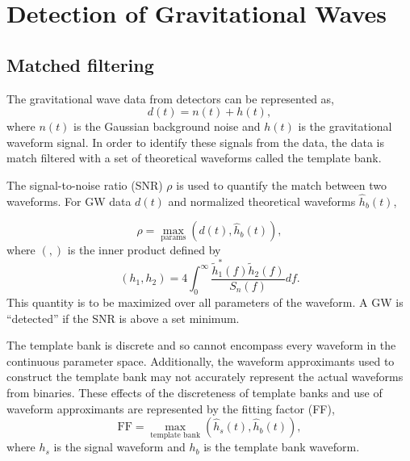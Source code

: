 \documentclass{article}
\newcommand{\red}[1]{{\color{red}{#1}\xspace}}
\begin{document}
\section{Detection of Gravitational Waves}
\subsection{Matched filtering}
The gravitational wave data from detectors can be represented as,
\begin{equation}
    d(t) = n(t) + h(t) ,\label{GWData}
\end{equation}
where $n(t)$ is the Gaussian \red{The noise is not generally Gaussian,
although over short periods in time it is often approximated as
Gaussian. Much of the analysis goes through without this assumption. Can
you make it clear where you really need the Gaussian assumption?}
background noise and $h(t)$ is the gravitational waveform signal. In order to identify these signals from the data, the data is match filtered with a set of theoretical waveforms called the template bank.

The signal-to-noise ratio (SNR) $\rho$ is used to quantify the match between two waveforms. For GW data $d(t)$ and normalized theoretical waveforms $\hat h_b(t)$,

\begin{equation}
    \rho = \max_\text{params} \left( d(t), \hat h_b (t)\right), \label{SNR}
\end{equation}
where $(,)$ is the inner product defined by
\begin{equation}
    (h_1, h_2) = 4 \int_{0}^{\infty} \frac{\tilde h_1^* (f)
    \tilde h_2 (f)}{S_n(f)}df.
\end{equation}
This quantity is to be maximized over all parameters of the waveform. A GW is ``detected'' if the SNR is above a set minimum.

The template bank is discrete and so
cannot encompass every waveform in the continuous parameter
space. Additionally, the waveform approximants used to construct
the template bank may not accurately represent the actual waveforms from binaries.  These effects of the discreteness of template banks and use of waveform approximants are represented by the fitting factor (FF),
\begin{equation}
    \text{FF} = \max_\text{template bank}
    \left ( \hat{h}_s(t), \hat{h}_b(t)\right ),
\end{equation}
where $h_s$ is the signal waveform and $h_b$ is the template bank waveform.
\end{document}
